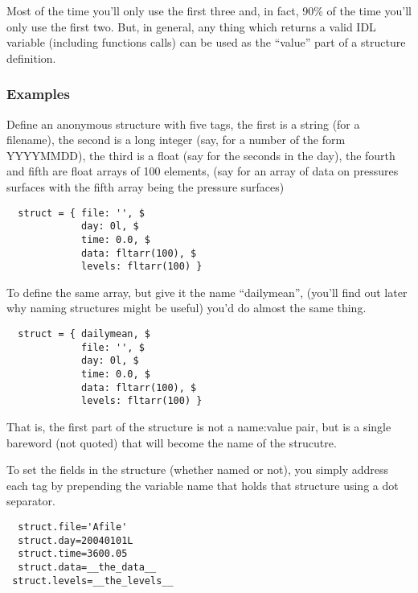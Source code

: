 \ee




Most of the time you'll only use the first three and, in fact, 90\% of
the time you'll only use the first two. But, in general, any thing
which returns a valid IDL variable (including functions calls) can be
used as the ``value'' part of a structure definition.

\subsubsection{Examples}

Define an anonymous structure with five tags, the first is a string
(for a filename), the second is a long integer (say, for a number of
the form YYYYMMDD), the third is a float (say for the seconds in the
day), the fourth and fifth are float arrays of 100 elements, (say for
an array of data on pressures surfaces with the fifth array being the
pressure surfaces)

\begin{IDLExample}
\begin{verbatim}
  struct = { file: '', $
             day: 0l, $
             time: 0.0, $
             data: fltarr(100), $
             levels: fltarr(100) }
\end{verbatim}
\end{IDLExample}

To define the same array, but give it the name ``dailymean'', (you'll
find out later why naming structures might be useful) you'd do almost
the same thing.



\begin{IDLExample}
\begin{verbatim}
  struct = { dailymean, $
             file: '', $
             day: 0l, $
             time: 0.0, $
             data: fltarr(100), $
             levels: fltarr(100) }
\end{verbatim}
\end{IDLExample}

That is, the first part of the structure is not a name:value pair, but
is a single bareword (not quoted) that will become the name of the
strucutre.

To set the fields in the structure (whether named or not), you simply
address each tag by prepending the variable name that holds that
structure using a dot separator.

\begin{IDLExample}
\begin{verbatim}
  struct.file='Afile'
  struct.day=20040101L
  struct.time=3600.05
  struct.data=__the_data__
 struct.levels=__the_levels__
\end{verbatim}
\end{IDLExample}


